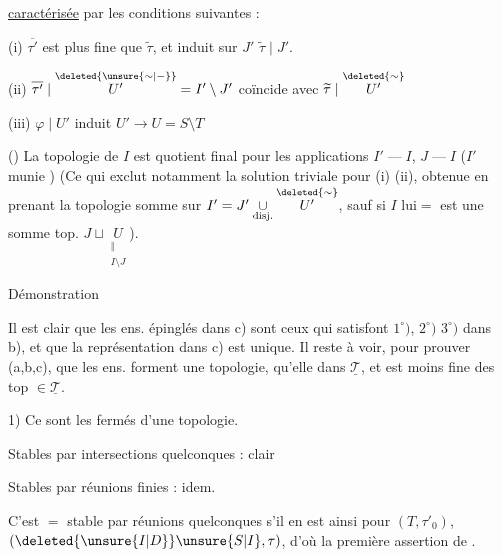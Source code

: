 \uline{caractérisée} par les conditions suivantes :

(i) $\overline{\tau'}$ est plus fine que $\widetilde{\tau}$, et induit sur $J'$ $\widetilde{\tau}\mid J'$.

(ii) $\overline{\tau'}\mid\overset{\deleted{\unsure{\sim|\mathord{-}}}}{U'}=I'\setminus J'$ coïncide avec $\widetilde{\tau}\mid\overset{\deleted{\sim}}{U'}$

(iii) $\varphi\mid U'$ induit   $U'\longrightarrow U=S\setminus T$

() La topologie de $I$ est quotient final pour les applications $I'\mathbin{\text{---}}I$, $J\mathbin{\text{---}}I$ ($I'$ munie  ) (Ce qui exclut notamment la solution triviale pour (i) (ii), obtenue en prenant la topologie somme sur  $I'=J'\underset{\text{disj.}}{\cup}\overset{\deleted{\sim}}{U'}$, sauf si $I$ lui$=$ est une somme top. $J\sqcup\underset{\substack{\Vert\\I\setminus J}}{U}$).

Démonstration

  Il est clair que les ens. épinglés dans c) sont ceux qui satisfont $1^\circ)$, $2^\circ)$ $3^\circ)$ dans b), et que la représentation dans c) est unique. Il reste à voir, pour prouver (a,b,c), que les ens. forment une topologie,  qu'elle   dans $\underline{\mathscr{T}}$, et est moins fine des top $\in\underline{\mathscr{T}}$.

1) Ce sont les fermés d'une topologie.

Stables par intersections quelconques : clair

Stables par réunions finies : idem.

C'est $=$ stable par réunions quelconques s'il en est ainsi pour $(T,\tau'_0)$, $(\deleted{\unsure{I|D}}\unsure{S|I},\tau)$, d'où la première assertion de .
